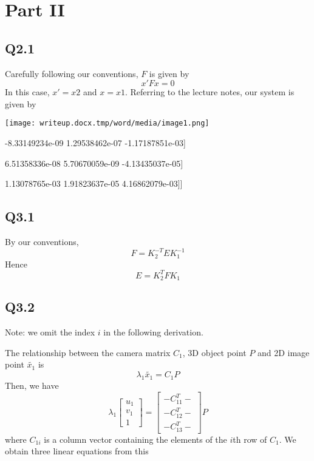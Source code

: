 \documentclass{scrbook}
\begin{document}
\section{Part II}

\subsection{Q2.1}

Carefully following our conventions, $F$ is given by
\begin{equation*}
x'Fx=0
\end{equation*}
In this case, $x'=x2$ and $x=x1$. Referring to the lecture notes, our system is given by

\centering{}\texttt{\texttt{[image: writeup.docx.tmp/word/media/image1.png]}}

\centering{}{[}{[}-8.33149234e-09  1.29538462e-07 -1.17187851e-03{]}

\centering{}{[} 6.51358336e-08  5.70670059e-09 -4.13435037e-05{]}

\centering{}{[} 1.13078765e-03  1.91823637e-05  4.16862079e-03{]}{]}

\subsection{Q3.1}

By our conventions,
\begin{equation*}
F={K}_{2}^{-T}E{K}_{1}^{-1}
\end{equation*}
Hence
\begin{equation*}
E={K}_{2}^{T}FK_{1}
\end{equation*}
\subsection{Q3.2}

Note: we omit the index $i$ in the following derivation.

The relationship between the camera matrix $C_{1}$, 3D object point $P$ and 2D image point $\widetilde{x_{1}}$ is
\begin{equation*}
\lambda _{1}\widetilde{x_{1}}=C_{1}P
\end{equation*}
Then, we have
\begin{equation*}
\lambda _{1}\left[\begin{array}{c}
u_{1}\\
v_{1}\\
1
\end{array}\right]=\left[\begin{array}{c}
-{C}_{11}^{T}-\\
-{C}_{12}^{T}-\\
-{C}_{13}^{T}-
\end{array}\right]P
\end{equation*}
where $C_{1i}$ is a column vector containing the elements of the $i$th row of $C_{1}$. We obtain three linear equations from this
\end{document}
